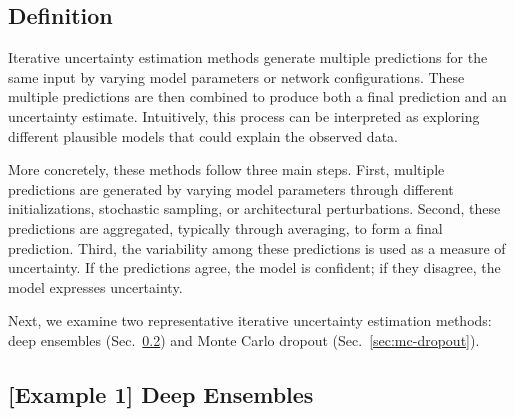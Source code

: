 \documentclass{article}
\begin{document}
\subsection{Definition}

Iterative uncertainty estimation methods generate multiple predictions for the same input by varying model parameters or network configurations. These multiple predictions are then combined to produce both a final prediction and an uncertainty estimate. Intuitively, this process can be interpreted as exploring different plausible models that could explain the observed data.

More concretely, these methods follow three main steps. First, multiple predictions are generated by varying model parameters through different initializations, stochastic sampling, or architectural perturbations. Second, these predictions are aggregated, typically through averaging, to form a final prediction. Third, the variability among these predictions is used as a measure of uncertainty. If the predictions agree, the model is confident; if they disagree, the model expresses uncertainty.

Next, we examine two representative iterative uncertainty estimation methods: deep ensembles (Sec.~\ref{sec:ensemble}) and Monte Carlo dropout (Sec.~\ref{sec:mc-dropout}).




\subsection{[Example 1] Deep Ensembles}
\label{sec:ensemble}
\end{document}
